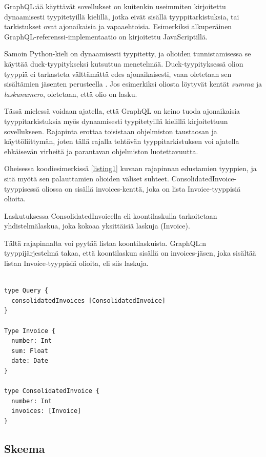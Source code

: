 GraphQL:ää käyttävät sovellukset on kuitenkin useimmiten kirjoitettu
dynaamisesti tyypitetyillä kielillä, jotka eivät sisällä
tyyppitarkistuksia, tai tarkistukset ovat ajonaikaisia ja vapaaehtoisia.
Esimerkiksi alkuperäinen GraphQL-referenssi-implementaatio on
kirjoitettu JavaScriptillä. \cite{graphqlRefImple2021Oct}

Samoin Python-kieli on dynaamisesti tyypitetty, ja olioiden
tunnistamisessa se käyttää duck-tyypitykseksi kutsuttua menetelmää.
Duck-tyypityksessä olion tyyppiä ei tarkasteta välttämättä edes
ajonaikaisesti, vaan oletetaan sen sisältämien jäsenten perusteella
\cite{pythonGloss2021Oct}. Jos esimerkiksi oliosta löytyvät kentät
\emph{summa} ja \emph{laskunumero}, oletetaan, että olio on lasku.

Tässä mielessä voidaan ajatella, että GraphQL on keino tuoda
ajonaikaisia tyyppitarkistuksia myös dynaamisesti tyypitetyillä kielillä
kirjoitettuun sovellukseen. Rajapinta erottaa toisistaan ohjelmiston
taustaosan ja käyttöliittymän, joten tällä rajalla tehtävän
tyyppitarkistuksen voi ajatella ehkäisevän virheitä ja parantavan
ohjelmiston luotettavuutta.

Oheisessa koodiesimerkissä \ref{listing1} kuvaan rajapinnan edustamien
tyyppien, ja sitä myötä sen palauttamien olioiden väliset suhteet.
ConsolidatedInvoice-tyyppisessä oliossa on sisällä invoices-kenttä, joka
on lista Invoice-tyyppisiä olioita.

Laskutuksessa ConsolidatedInvoicella eli koontilaskulla tarkoitetaan
yhdistelmälaskua, joka kokoaa yksittäisiä laskuja (Invoice).

Tältä rajapinnalta voi pyytää listaa koontilaskuista. GraphQL:n
tyyppijärjestelmä takaa, että koontilaskun sisällä on invoices-jäsen,
joka sisältää listan Invoice-tyyppisiä olioita, eli siis laskuja.

\begin{code}
  \begin{verbatim}

type Query {
  consolidatedInvoices [ConsolidatedInvoice]
}

Type Invoice {
  number: Int
  sum: Float
  date: Date
}

type ConsolidatedInvoice {
  number: Int
  invoices: [Invoice]
}
  \end{verbatim}
  \label{listing1}
\end{code}

\hypertarget{skeema}{%
\subsection{Skeema}\label{skeema}}

